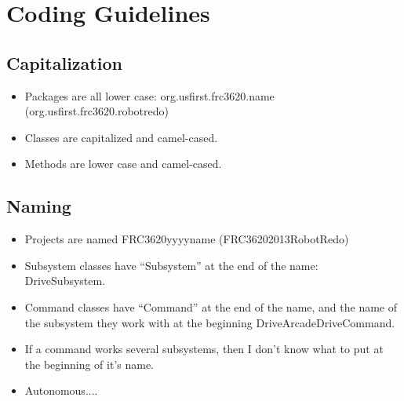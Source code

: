 \documentclass[]{article}
\begin{document}
\setcounter{secnumdepth}{4}

\section {Coding Guidelines}

\subsection {Capitalization}

\begin{itemize}
\item Packages are all lower case: org.usfirst.frc3620.name (org.usfirst.frc3620.robotredo)
\item Classes are capitalized and camel-cased.
\item Methods are lower case and camel-cased.
\end{itemize}

\subsection {Naming}

\begin{itemize}
\item Projects are named FRC3620yyyyname (FRC36202013RobotRedo)
\item Subsystem classes have “Subsystem” at the end of the name: DriveSubsystem.
\item Command classes have “Command” at the end of the name, and the name of the subsystem they work with at the beginning DriveArcadeDriveCommand.
\item If a command works several subsystems, then I don't know what to put at the beginning of it's name.
\item Autonomous....
\end{itemize}
\end{document}

